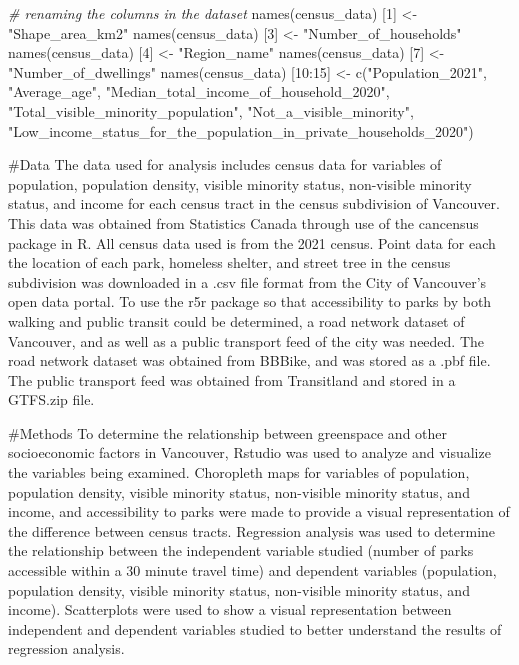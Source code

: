 \documentclass[
]{article}
\newenvironment{Shaded}{\begin{snugshade}}{\end{snugshade}}
\newcommand{\CommentTok}[1]{\textcolor[rgb]{0.56,0.35,0.01}{\textit{#1}}}
\newcommand{\DecValTok}[1]{\textcolor[rgb]{0.00,0.00,0.81}{#1}}
\newcommand{\FunctionTok}[1]{\textcolor[rgb]{0.00,0.00,0.00}{#1}}
\newcommand{\NormalTok}[1]{#1}
\newcommand{\OtherTok}[1]{\textcolor[rgb]{0.56,0.35,0.01}{#1}}
\newcommand{\SpecialCharTok}[1]{\textcolor[rgb]{0.00,0.00,0.00}{#1}}
\newcommand{\StringTok}[1]{\textcolor[rgb]{0.31,0.60,0.02}{#1}}
\begin{document}
\begin{Shaded}
\begin{Highlighting}[]
\CommentTok{\# renaming the columns in the dataset}
\FunctionTok{names}\NormalTok{(census\_data) [}\DecValTok{1}\NormalTok{] }\OtherTok{\textless{}{-}} \StringTok{"Shape\_area\_km2"}
\FunctionTok{names}\NormalTok{(census\_data) [}\DecValTok{3}\NormalTok{] }\OtherTok{\textless{}{-}} \StringTok{"Number\_of\_households"}
\FunctionTok{names}\NormalTok{(census\_data) [}\DecValTok{4}\NormalTok{] }\OtherTok{\textless{}{-}} \StringTok{"Region\_name"}
\FunctionTok{names}\NormalTok{(census\_data) [}\DecValTok{7}\NormalTok{] }\OtherTok{\textless{}{-}} \StringTok{"Number\_of\_dwellings"}
\FunctionTok{names}\NormalTok{(census\_data) [}\DecValTok{10}\SpecialCharTok{:}\DecValTok{15}\NormalTok{] }\OtherTok{\textless{}{-}} \FunctionTok{c}\NormalTok{(}\StringTok{"Population\_2021"}\NormalTok{, }\StringTok{"Average\_age"}\NormalTok{, }\StringTok{"Median\_total\_income\_of\_household\_2020"}\NormalTok{, }\StringTok{"Total\_visible\_minority\_population"}\NormalTok{, }\StringTok{"Not\_a\_visible\_minority"}\NormalTok{, }\StringTok{"Low\_income\_status\_for\_the\_population\_in\_private\_households\_2020"}\NormalTok{)}
\end{Highlighting}
\end{Shaded}

\#Data The data used for analysis includes census data for variables of
population, population density, visible minority status, non-visible
minority status, and income for each census tract in the census
subdivision of Vancouver. This data was obtained from Statistics Canada
through use of the cancensus package in R. All census data used is from
the 2021 census. Point data for each the location of each park, homeless
shelter, and street tree in the census subdivision was downloaded in a
.csv file format from the City of Vancouver's open data portal. To use
the r5r package so that accessibility to parks by both walking and
public transit could be determined, a road network dataset of Vancouver,
and as well as a public transport feed of the city was needed. The road
network dataset was obtained from BBBike, and was stored as a .pbf file.
The public transport feed was obtained from Transitland and stored in a
GTFS.zip file.

\#Methods To determine the relationship between greenspace and other
socioeconomic factors in Vancouver, Rstudio was used to analyze and
visualize the variables being examined. Choropleth maps for variables of
population, population density, visible minority status, non-visible
minority status, and income, and accessibility to parks were made to
provide a visual representation of the difference between census tracts.
Regression analysis was used to determine the relationship between the
independent variable studied (number of parks accessible within a 30
minute travel time) and dependent variables (population, population
density, visible minority status, non-visible minority status, and
income). Scatterplots were used to show a visual representation between
independent and dependent variables studied to better understand the
results of regression analysis.
\end{document}

